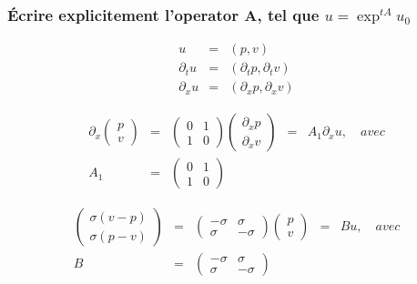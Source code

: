 \documentclass[a4paper,11pt]{article}
\begin{document}
\subsubsection*{Écrire explicitement l'operator A, tel que \( u = \exp^{tA}u_{0} \)}

\begin{equation*}
\begin{array}{rcl}
    u &=& (p, v) \\
    \partial_{t}u &=& (\partial_{t}p,  \partial_{t}v) \\
    \partial_{x}u &=& (\partial_{x}p,  \partial_{x}v)
\end{array}
\end{equation*}

\begin{equation*}
\begin{array}{rclcl}
    \partial_{x}
    \begin{pmatrix}
        p \\
        v
    \end{pmatrix} &=&
    \begin{pmatrix}
        0 & 1 \\
        1 & 0
    \end{pmatrix}
    \begin{pmatrix}
        \partial_{x}p \\
        \partial_{x}v
    \end{pmatrix} &=&
    A_{1}\partial_{x}u, \quad avec \\
    A_{1} &=&
    \begin{pmatrix}
        0 & 1 \\
        1 & 0
    \end{pmatrix} & &
\end{array}
\end{equation*}

\begin{equation*}
\begin{array}{rclcl}
    \begin{pmatrix}
        \sigma(v-p) \\
        \sigma(p-v)
    \end{pmatrix} &=&
    \begin{pmatrix}
        -\sigma & \sigma \\
        \sigma & -\sigma
    \end{pmatrix}
    \begin{pmatrix}
        p \\
        v
    \end{pmatrix} &=&
    Bu, \quad avec \\
    B &=&
    \begin{pmatrix}
        -\sigma & \sigma \\
        \sigma & -\sigma
    \end{pmatrix} & &
\end{array}
\end{equation*}
\end{document}
